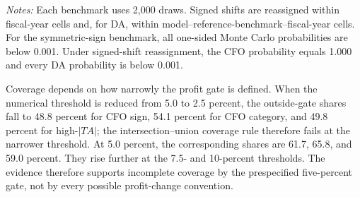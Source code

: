 \begin{table}[htbp]
\centering
\caption{State-independent sign-switch benchmarks for RQ2}
\label{tab:switch_benchmarks}
\scriptsize
{}
\begin{minipage}{0.97\textwidth}\footnotesize
\textit{Notes:} Each benchmark uses 2,000 draws. Signed shifts are reassigned within fiscal-year cells and, for DA, within model--reference-benchmark--fiscal-year cells. For the symmetric-sign benchmark, all one-sided Monte Carlo probabilities are below 0.001. Under signed-shift reassignment, the CFO probability equals 1.000 and every DA probability is below 0.001.
\end{minipage}
\end{table}

Coverage depends on how narrowly the profit gate is defined. When the numerical threshold is reduced from 5.0 to 2.5 percent, the outside-gate shares fall to 48.8 percent for CFO sign, 54.1 percent for CFO category, and 49.8 percent for high-$|TA|$; the intersection--union coverage rule therefore fails at the narrower threshold. At 5.0 percent, the corresponding shares are 61.7, 65.8, and 59.0 percent. They rise further at the 7.5- and 10-percent thresholds. The evidence therefore supports incomplete coverage by the prespecified five-percent gate, not by every possible profit-change convention.
